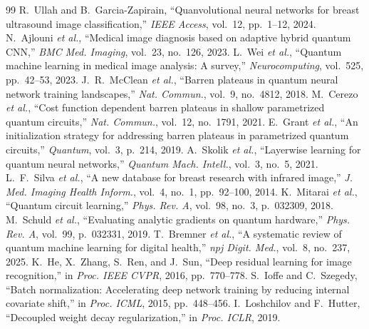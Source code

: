 \documentclass[conference]{IEEEtran}
\begin{document}
\begin{thebibliography}{99}
 R.~Ullah and B.~Garcia-Zapirain, ``Quanvolutional neural networks for breast ultrasound image classification,'' \textit{IEEE Access}, vol.~12, pp.~1--12, 2024.
 N.~Ajlouni \textit{et al.}, ``Medical image diagnosis based on adaptive hybrid quantum CNN,'' \textit{BMC Med. Imaging}, vol.~23, no.~126, 2023.
 L.~Wei \textit{et al.}, ``Quantum machine learning in medical image analysis: A survey,'' \textit{Neurocomputing}, vol.~525, pp.~42--53, 2023.
 J.~R.~McClean \textit{et al.}, ``Barren plateaus in quantum neural network training landscapes,'' \textit{Nat. Commun.}, vol.~9, no.~4812, 2018.
 M.~Cerezo \textit{et al.}, ``Cost function dependent barren plateaus in shallow parametrized quantum circuits,'' \textit{Nat. Commun.}, vol.~12, no.~1791, 2021.
 E.~Grant \textit{et al.}, ``An initialization strategy for addressing barren plateaus in parametrized quantum circuits,'' \textit{Quantum}, vol.~3, p.~214, 2019.
 A.~Skolik \textit{et al.}, ``Layerwise learning for quantum neural networks,'' \textit{Quantum Mach. Intell.}, vol.~3, no.~5, 2021.
 L.~F.~Silva \textit{et al.}, ``A new database for breast research with infrared image,'' \textit{J. Med. Imaging Health Inform.}, vol.~4, no.~1, pp.~92--100, 2014.
 K.~Mitarai \textit{et al.}, ``Quantum circuit learning,'' \textit{Phys. Rev. A}, vol.~98, no.~3, p.~032309, 2018.
 M.~Schuld \textit{et al.}, ``Evaluating analytic gradients on quantum hardware,'' \textit{Phys. Rev. A}, vol.~99, p.~032331, 2019.
 T.~Bremner \textit{et al.}, ``A systematic review of quantum machine learning for digital health,'' \textit{npj Digit. Med.}, vol.~8, no.~237, 2025.
 K.~He, X.~Zhang, S.~Ren, and J.~Sun, ``Deep residual learning for image recognition,'' in \textit{Proc. IEEE CVPR}, 2016, pp.~770--778.
 S.~Ioffe and C.~Szegedy, ``Batch normalization: Accelerating deep network training by reducing internal covariate shift,'' in \textit{Proc. ICML}, 2015, pp.~448--456.
 I.~Loshchilov and F.~Hutter, ``Decoupled weight decay regularization,'' in \textit{Proc. ICLR}, 2019.

\end{thebibliography}
\end{document}
